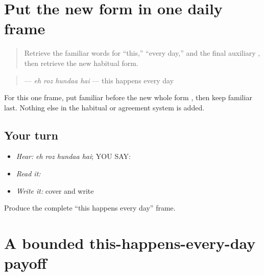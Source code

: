 \section[\texorpdfstring{\pa{ਇਹ} \pa{ਰੋਜ਼} \pa{ਹੁੰਦਾ} \pa{ਹੈ} (eh roz hundaa hai)}{ਇਹ ਰੋਜ਼ ਹੁੰਦਾ ਹੈ (eh roz hundaa hai)}]{Put the new form in one daily frame}

\label{lesson:PA-C207-daily-frame}



\begin{quote}
Retrieve the familiar words for “this,” “every day,” and the final auxiliary \textbf{}, then retrieve the new habitual form.
\end{quote}

\begin{grammarlens}[title={Grammar Lens}]
\begin{quote}
\textbf{   } — \emph{eh roz hundaa hai} — this happens every day
\end{quote}

For this one frame, put familiar \textbf{ } before the new whole form \textbf{}, then keep familiar \textbf{} last. Nothing else in the habitual or agreement system is added.
\end{grammarlens}

\subsection*{Your turn}
\begin{itemize}
\raggedright
  \item \emph{Hear:} \emph{eh roz hundaa hai}; YOU SAY: \textbf{   }
  \item \emph{Read it:} \textbf{   }
  \item \emph{Write it:} cover and write \textbf{   }
\end{itemize}

\begin{tcolorbox}[breakable,colback=teal!4,colframe=teal!35!black,title={Before you move on}]
Produce the complete “this happens every day” frame.
\end{tcolorbox}
\section[\texorpdfstring{\pa{ਇਹ} \pa{ਰੋਜ਼} \pa{ਹੁੰਦਾ} \pa{ਹੈ} (eh roz hundaa hai)}{ਇਹ ਰੋਜ਼ ਹੁੰਦਾ ਹੈ (eh roz hundaa hai)}]{A bounded this-happens-every-day payoff}

